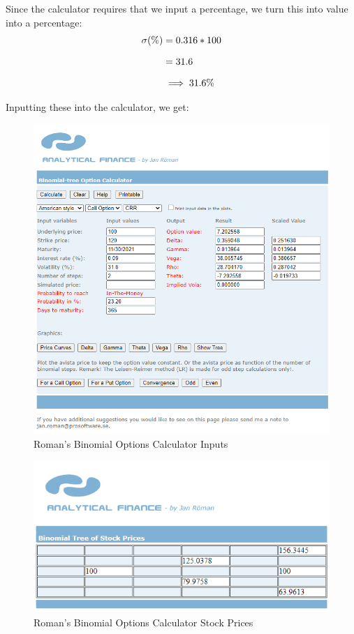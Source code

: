 \documentclass[12pt, letterpaper]{article}
\begin{document}
Since the calculator requires that we input a percentage, we turn this into value into a percentage:
\begin{equation*}
  \setlength{\jot}{10pt}
  \begin{split}
    \sigma (\%)
    & = 0.316 * 100
    \\
    & = 31.6
    \\
    & \implies 31.6\%
  \end{split}
\end{equation*}


Inputting these into the calculator, we get:
\begin{figure}[H]
  \includegraphics[scale=0.8]{Roman_binomial_calculator_inputs}
  \caption{Roman's Binomial Options Calculator Inputs}
\end{figure}

\begin{figure}[H]
  \includegraphics{Roman_binomial_calculator_stock_prices}
  \caption{Roman's Binomial Options Calculator Stock Prices}
\end{figure}
\end{document}
